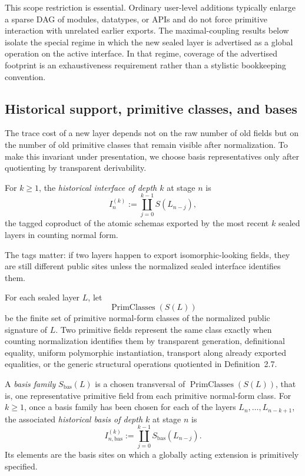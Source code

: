 This scope restriction is essential.  Ordinary user-level additions typically enlarge a sparse
DAG of modules, datatypes, or APIs and do not force primitive interaction with unrelated
earlier exports.  The maximal-coupling results below isolate the special regime in which the
new sealed layer is advertised as a global operation on the active interface.  In that regime,
coverage of the advertised footprint is an exhaustiveness requirement rather than a stylistic
bookkeeping convention.

\subsection{Historical support, primitive classes, and bases}

The trace cost of a new layer depends not on the raw number of old fields but on the number
of old primitive classes that remain visible after normalization.  To make this invariant under
presentation, we choose basis representatives only after quotienting by transparent
derivability.

\begin{definition}
For \(k\geq 1\), the \emph{historical interface of depth \(k\)} at stage \(n\) is
\[
  I_n^{(k)} := \coprod_{j=0}^{k-1} S(L_{n-j}),
\]
the tagged coproduct of the atomic schemas exported by the most recent \(k\) sealed layers
in counting normal form.
\end{definition}

The tags matter: if two layers happen to export isomorphic-looking fields, they are still
different public sites unless the normalized sealed interface identifies them.

\begin{definition}
For each sealed layer \(L\), let
\[
  \operatorname{PrimClasses}(S(L))
\]
be the finite set of primitive normal-form classes of the normalized public signature of
\(L\).  Two primitive fields represent the same class exactly when counting normalization
identifies them by transparent generation, definitional equality, uniform polymorphic
instantiation, transport along already exported equalities, or the generic structural
operations quotiented in Definition~2.7.

A \emph{basis family} \(S_{\mathrm{bas}}(L)\) is a chosen transversal of
\(\operatorname{PrimClasses}(S(L))\), that is, one representative primitive field from each
primitive normal-form class.  For \(k\geq 1\), once a basis family has been chosen for each of
the layers \(L_n,\ldots,L_{n-k+1}\), the associated \emph{historical basis of depth \(k\)} at
stage \(n\) is
\[
  I_{n,\mathrm{bas}}^{(k)} := \coprod_{j=0}^{k-1} S_{\mathrm{bas}}(L_{n-j}).
\]
Its elements are the basis sites on which a globally acting extension is primitively specified.
\end{definition}

